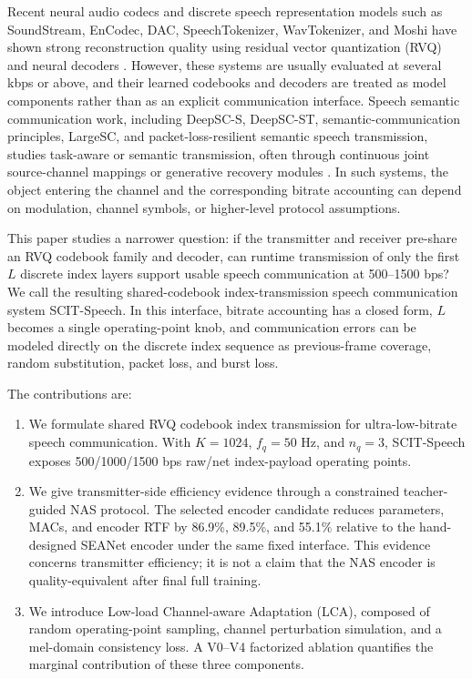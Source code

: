 ﻿\documentclass[conference]{IEEEtran}
\newcommand{\method}{SCIT-Speech}
\begin{document}
Recent neural audio codecs and discrete speech representation models such as SoundStream, EnCodec, DAC, SpeechTokenizer, WavTokenizer, and Moshi have shown strong reconstruction quality using residual vector quantization (RVQ) and neural decoders \cite{zeghidour2021soundstream,defossez2022encodec,kumar2023dac,zhang2023speechtokenizer,ji2024wavtokenizer,defossez2024moshi}. However, these systems are usually evaluated at several kbps or above, and their learned codebooks and decoders are treated as model components rather than as an explicit communication interface. Speech semantic communication work, including DeepSC-S, DeepSC-ST, semantic-communication principles, LargeSC, and packet-loss-resilient semantic speech transmission, studies task-aware or semantic transmission, often through continuous joint source-channel mappings or generative recovery modules \cite{weng2021deepscs,weng2022deepscst,qin2022semantic,tian2025largesc,han2025packetloss}. In such systems, the object entering the channel and the corresponding bitrate accounting can depend on modulation, channel symbols, or higher-level protocol assumptions.

This paper studies a narrower question: if the transmitter and receiver pre-share an RVQ codebook family and decoder, can runtime transmission of only the first \(L\) discrete index layers support usable speech communication at 500--1500 bps? We call the resulting shared-codebook index-transmission speech communication system \method. In this interface, bitrate accounting has a closed form, \(L\) becomes a single operating-point knob, and communication errors can be modeled directly on the discrete index sequence as previous-frame coverage, random substitution, packet loss, and burst loss.

The contributions are:
\begin{enumerate}
  \item We formulate shared RVQ codebook index transmission for ultra-low-bitrate speech communication. With \(K=1024\), \(f_q=50\) Hz, and \(n_q=3\), \method{} exposes 500/1000/1500 bps raw/net index-payload operating points.
  \item We give transmitter-side efficiency evidence through a constrained teacher-guided NAS protocol. The selected encoder candidate reduces parameters, MACs, and encoder RTF by 86.9\%, 89.5\%, and 55.1\% relative to the hand-designed SEANet encoder under the same fixed interface. This evidence concerns transmitter efficiency; it is not a claim that the NAS encoder is quality-equivalent after final full training.
  \item We introduce Low-load Channel-aware Adaptation (LCA), composed of random operating-point sampling, channel perturbation simulation, and a mel-domain consistency loss. A V0--V4 factorized ablation quantifies the marginal contribution of these three components.
\end{enumerate}
\end{document}
